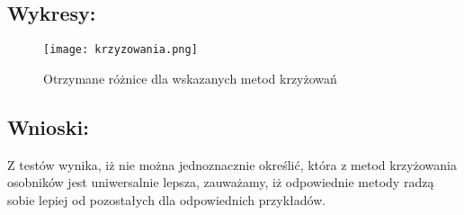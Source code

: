   \subsection{Wykresy: }
  \begin{figure}[H]
    \texttt{[image: krzyzowania.png]}
    \centering
    \caption{Otrzymane różnice dla wskazanych metod krzyżowań}
  \end{figure}
  \subsection{Wnioski: }
    Z testów wynika, iż nie można jednoznacznie określić, która z metod krzyżowania osobników jest uniwersalnie lepsza, zauważamy, iż odpowiednie metody
    radzą sobie lepiej od pozostałych dla odpowiednich przykładów.